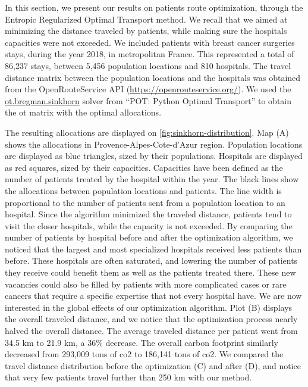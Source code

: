 In this section, we present our results on patients route optimization, through
the Entropic Regularized Optimal Transport method. We recall that we aimed at
minimizing the distance traveled by patients, while making sure the hospitals
capacities were not exceeded. We included patients with breast cancer surgeries
stays, during the year 2018, in metropolitan France. This represented a total of
86,237 stays, between 5,456 population locations and 810 hospitals. The travel
distance matrix between the population locations and the hospitals was obtained
from the OpenRouteService API (\url{https://openrouteservice.org/}). We used the
\href{https://pythonot.github.io/gen_modules/ot.bregman.html#ot.bregman.sinkhorn}{ot.bregman.sinkhorn}
solver from ``POT: Python Optimal Transport'' \cite{flamary_pot_2021} to obtain
the \ac{ot} matrix with the optimal allocations.

The resulting allocations are displayed on \cref{fig:sinkhorn-distribution}. Map
(A) shows the allocations in Provence-Alpes-Cote-d'Azur region. Population
locations are displayed as blue triangles, sized by their populations. Hospitals
are displayed as red squares, sized by their capacities. Capacities have been
defined as the number of patients treated by the hospital within the year. The
black lines show the allocations between population locations and patients. The
line width is proportional to the number of patients sent from a population
location to an hospital. Since the algorithm minimized the traveled distance,
patients tend to visit the closer hospitals, while the capacity is not exceeded.
By comparing the number of patients by hospital before and after the
optimization algorithm, we noticed that the largest and most specialized
hospitals received less patients than before. These hospitals are often
saturated, and lowering the number of patients they receive could benefit them
as well as the patients treated there. These new vacancies could also be filled
by patients with more complicated cases or rare cancers that require a specific
expertise that not every hospital have. We are now interested in the global
effects of our optimization algorithm. Plot (B) displays the overall traveled
distance, and we notice that the optimization process nearly halved the overall
distance. The average traveled distance per patient went from 34.5 km to 21.9
km, a 36\% decrease. The overall carbon footprint similarly decreased from
293,009 tons of \ac{co2} to 186,141 tons of \ac{co2}. We compared the travel distance distribution before the optimization
(C) and after (D), and notice that very few patients travel further than 250
km with our method.


